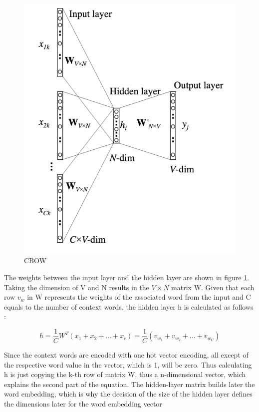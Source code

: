 \documentclass[12pt, a4paper, titlepage]{article}
\begin{document}
\begin{figure}[]
  \center
  \includegraphics[scale=0.5]{word2vecCBOW.png}
  \caption{\label{fig: F1} \ac{CBOW} \citep[6]{rong2014}}
\end{figure}

The weights between the input layer and the hidden layer are shown in figure \ref{fig: F1}. Taking the dimension of V and N results in the $V \times N$ matrix W. Given that each row $v_w$ in W represents the weights of the associated word from the input and C equals to the number of context words, the hidden layer h is calculated as follows \citep{rong2014}:

\[ h = \frac{1}{C} W^T(x_1 + x_2 + ... +x_c) = \frac{1}{C}(v_{w_1} + v_{w_2} + ... + v_{w_C}) \]

Since the context words are encoded with one hot vector encoding, all except of the respective word value in the vector, which is 1, will be zero. Thus calculating h is just copying the k-th row of matrix W, thus a n-dimensional vector, which explains the second part of the equation. The hidden-layer matrix builds later the word embedding, which is why the decision of the size of the hidden layer defines the dimensions later for the word embedding vector \citep{rong2014}
\end{document}
